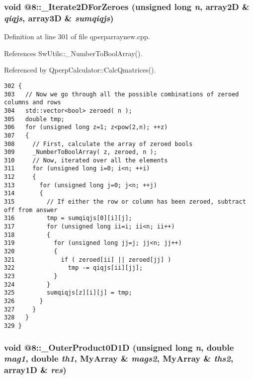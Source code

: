 \subsubsection{\setlength{\rightskip}{0pt plus 5cm}void @8::\_\-Iterate2DForZeroes (unsigned long {\em n}, array2D \& {\em qiqjs}, array3D \& {\em sumqiqjs})\hspace{0.3cm}{\tt  [static]}}\label{qperparraynew_8cpp_5e634626e89e347ac7105f3a34a7f065}




Definition at line 301 of file qperparraynew.cpp.

References SwUtils::\_\-NumberToBoolArray().

Referenced by QperpCalculator::CalcQmatrices().

\begin{Code}\begin{verbatim}302 {
303   // Now we go through all the possible combinations of zeroed columns and rows
304   std::vector<bool> zeroed( n );
305   double tmp;
306   for (unsigned long z=1; z<pow(2,n); ++z)
307   {
308     // First, calculate the array of zeroed bools
309     _NumberToBoolArray( z, zeroed, n );
310     // Now, iterated over all the elements
311     for (unsigned long i=0; i<n; ++i) 
312     { 
313       for (unsigned long j=0; j<n; ++j) 
314       {
315         // If either the row or column has been zeroed, subtract off from answer
316         tmp = sumqiqjs[0][i][j];
317         for (unsigned long ii=i; ii<n; ii++)
318         {
319           for (unsigned long jj=j; jj<n; jj++)
320           {
321             if ( zeroed[ii] || zeroed[jj] )
322               tmp -= qiqjs[ii][jj];
323           }
324         }
325         sumqiqjs[z][i][j] = tmp;
326       }
327     }
328   }
329 }
\end{verbatim}
\end{Code}


\subsubsection{\setlength{\rightskip}{0pt plus 5cm}void @8::\_\-OuterProduct0D1D (unsigned long {\em n}, double {\em mag1}, double {\em th1}, MyArray \& {\em mags2}, MyArray \& {\em ths2}, array1D \& {\em res})\hspace{0.3cm}{\tt  [static]}}\label{qperparraynew_8cpp_fc899dbd2fbe818860b4c384c52fb84f}





